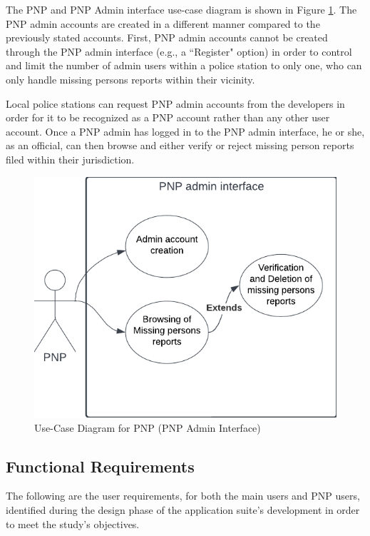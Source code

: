 The PNP and PNP Admin interface use-case diagram is shown in Figure \ref{fig:UseCasePNP}. The PNP admin accounts are created in a different manner compared to the previously stated accounts. First, PNP admin accounts cannot be created through the PNP admin interface (e.g., a ``Register" option) in order to control and limit the number of admin users within a police station to only one, who can only handle missing persons reports within their vicinity. 

Local police stations can request PNP admin accounts from the developers in order for it to be recognized as a PNP account rather than any other user account. Once a PNP admin has logged in to the PNP admin interface, he or she, as an official, can then browse and either verify or reject missing person reports filed within their jurisdiction.
\begin{figure}[!h]
    \centering
    \includegraphics[scale=0.5]{figures/Chapter3/Chapt3_UseCase_PNP.png}
    \caption{Use-Case Diagram for PNP (PNP Admin Interface)}
    \label{fig:UseCasePNP}
\end{figure}


\subsection{Functional Requirements}

The following are the user requirements, for both the main users and PNP users, identified during the design phase of the application suite's development in order to meet the study's objectives. 

